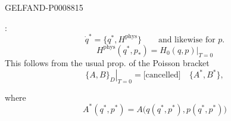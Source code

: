 \begin{GelfandAdjacentEvidence}{GELFAND-P000881}{5}


:
\begin{equation*}
\dot q^*=\{q^*,H^{\mathrm{phys}}\}\qquad\text{and likewise for }p.
\tag{18}
\end{equation*}
\begin{equation*}
H^{\mathrm{phys}}(q^*,p_*)=\left.H_0(q,p)\right|_{T=0}
\tag{19}
\end{equation*}
This follows from the usual prop. of the Poisson bracket
\begin{equation*}
\left.\{A,B\}_D\right|_{T=0}=\text{[cancelled]}\quad\{A^*,B^*\},
\tag{20}
\end{equation*}
\end{GelfandAdjacentEvidence}


where
\begin{equation*}
A^*(q^*,p^*)=A\bigl(q(q^*,p^*),p(q^*,p^*)\bigr)
\tag{21}
\end{equation*}


